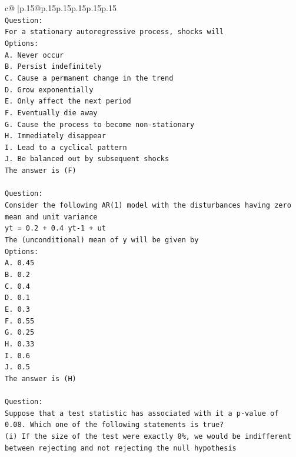 \documentclass{article}
\begin{document}
{\begin{supertabular}{c@{$\;$}|p{.15\linewidth}@{}p{.15\linewidth}p{.15\linewidth}p{.15\linewidth}p{.15\linewidth}p{.15\linewidth}}
{{{\\ 
\texttt{Question:} \\
\texttt{For a stationary autoregressive process, shocks will} \\
\texttt{Options:} \\
\texttt{A. Never occur} \\
\texttt{B. Persist indefinitely} \\
\texttt{C. Cause a permanent change in the trend} \\
\texttt{D. Grow exponentially} \\
\texttt{E. Only affect the next period} \\
\texttt{F. Eventually die away} \\
\texttt{G. Cause the process to become non{-}stationary} \\
\texttt{H. Immediately disappear} \\
\texttt{I. Lead to a cyclical pattern} \\
\texttt{J. Be balanced out by subsequent shocks} \\
\texttt{The answer is (F)} \\
\\ 
\texttt{Question:} \\
\texttt{Consider the following AR(1) model with the disturbances having zero mean and unit variance} \\
\texttt{yt = 0.2 + 0.4 yt{-}1 + ut} \\
\texttt{The (unconditional) mean of y will be given by} \\
\texttt{Options:} \\
\texttt{A. 0.45} \\
\texttt{B. 0.2} \\
\texttt{C. 0.4} \\
\texttt{D. 0.1} \\
\texttt{E. 0.3} \\
\texttt{F. 0.55} \\
\texttt{G. 0.25} \\
\texttt{H. 0.33} \\
\texttt{I. 0.6} \\
\texttt{J. 0.5} \\
\texttt{The answer is (H)} \\
\\ 
\texttt{Question:} \\
\texttt{Suppose that a test statistic has associated with it a p{-}value of 0.08. Which one of the following statements is true?} \\
\texttt{(i) If the size of the test were exactly 8\%, we would be indifferent between rejecting and not rejecting the null hypothesis} \\
}}}
\end{supertabular}}
\end{document}
